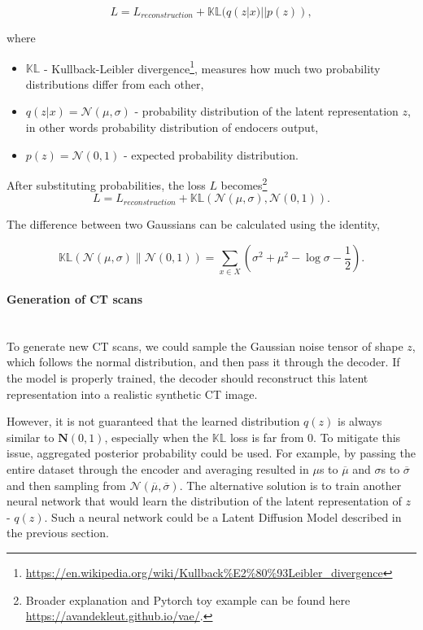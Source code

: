 \begin{equation}
    L = L_{reconstruction} + \mathbb{KL}(q(z | x) || p(z)),
\end{equation}

where 
\begin{itemize}
    \item $\mathbb{KL}$ - Kullback-Leibler divergence\footnote{\url{https://en.wikipedia.org/wiki/Kullback\%E2\%80\%93Leibler_divergence}}, measures how much two probability distributions differ from each other,
    \item $q(z | x) = \mathcal{N}(\mu, \sigma)$ - probability distribution of the latent representation $z$, in other words probability distribution of endocers output,
    \item $p(z) = \mathcal{N}(0,1)$ - expected probability distribution.
\end{itemize}

After substituting probabilities, the loss $L$ becomes\footnote{Broader explanation and Pytorch toy example can be found here \url{https://avandekleut.github.io/vae/}.}
\begin{equation}
    L = L_{reconstruction} + \mathbb{KL}(\mathcal{N}(\mu,\sigma), \mathcal{N}(0,1)).
\end{equation}

The difference between two Gaussians can be calculated using the identity\cite{7449}, 

\begin{equation}
    \mathbb{KL}\left( \mathcal{N}(\mu, \sigma) \parallel \mathcal{N}(0, 1) \right) = \sum_{x \in X} \left( \sigma^2 + \mu^2 - \log \sigma - \frac{1}{2} \right).
\end{equation}


\paragraph{Generation of CT scans}\mbox{}\\

To generate new CT scans, we could sample the Gaussian noise tensor of shape $z$, which follows the normal distribution, and then pass it through the decoder.
If the model is properly trained, the decoder should reconstruct this latent representation into a realistic synthetic CT image. 

However, it is not guaranteed that the learned distribution $q(z)$ is always similar to $\mathbf{N}(0,1)$, especially when the $\mathbb{KL}$ loss is far from $0$. To mitigate this issue, aggregated posterior probability could be used. For example, by passing the entire dataset through the encoder and averaging resulted in $\mu$s to $\overline{\mu}$ and $\sigma$s to $\overline{\sigma}$ and then sampling from $\mathcal{N}(\overline{\mu}, \overline{\sigma})$. The alternative solution is to train another neural network that would learn the distribution of the latent representation of $z$ - $q(z)$. Such a neural network could be a Latent Diffusion Model described in the previous section.

